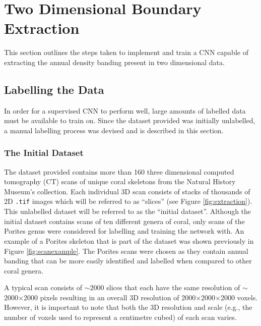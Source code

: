 \section{Two Dimensional Boundary Extraction}

This section outlines the steps taken to implement and train a CNN capable of extracting the annual density banding present in two dimensional data.

\subsection{Labelling the Data}
\label{sec:2dlabel}

In order for a supervised CNN to perform well, large amounts of labelled data must be available to train on. Since the dataset provided was initially unlabelled, a manual labelling process was devised and is described in this section.

\subsubsection{The Initial Dataset}

The dataset provided contains more than 160 three dimensional computed tomography (CT) scans of unique coral skeletons from the Natural History Museum's collection. Each individual 3D scan consists of stacks of thousands of 2D \texttt{.tif} images which will be referred to as ``slices'' (see Figure \ref{fig:extraction}). This unlabelled dataset will be referred to as the ``initial dataset''. Although the initial dataset contains scans of ten different genera of coral, only scans of the Porites genus were considered for labelling and training the network with. An example of a Porites skeleton that is part of the dataset was shown previously in Figure \ref{fig:scanexample}. The Porites scans were chosen as they contain annual banding that can be more easily identified and labelled when compared to other coral genera.

A typical scan consists of ${\sim}2000$ slices that each have the same resolution of ${\sim}$2000$\times$2000 pixels resulting in an overall 3D resolution of 2000$\times$2000$\times$2000 voxels. However, it is important to note that both the 3D resolution and scale (e.g., the number of voxels used to represent a centimetre cubed) of each scan varies.

